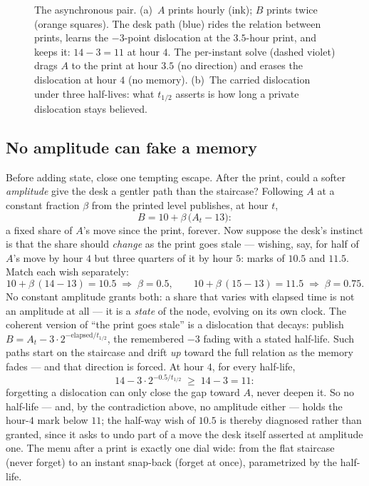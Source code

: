 \begin{figure}[htbp]
\centering
{}
\caption{The asynchronous pair.  (a)~$A$ prints hourly (ink); $B$
prints twice (orange squares).  The desk path (blue) rides the
relation between prints, learns the $-3$-point dislocation at the
$3.5$-hour print, and keeps it: $14-3=11$ at hour $4$.  The
per-instant solve (dashed violet) drags $A$ to the print at hour
$3.5$ (no direction) and erases the dislocation at hour $4$ (no
memory).  (b)~The carried dislocation under three half-lives: what
$t_{1/2}$ asserts is how long a private dislocation stays believed.}
\label{fig:grstory}
\end{figure}

\subsection{No amplitude can fake a memory}

Before adding state, close one tempting escape.  After the print,
could a softer \emph{amplitude} give the desk a gentler path than the
staircase?  Following $A$ at a constant fraction $\beta$ from the
printed level publishes, at hour $t$,
\[
B=10+\beta\,\bigl(A_t-13\bigr):
\]
a fixed share of $A$'s move since the print, forever.  Now suppose
the desk's instinct is that the share should \emph{change} as the
print goes stale --- wishing, say, for half of $A$'s move by hour $4$
but three quarters of it by hour $5$: marks of $10.5$ and $11.5$.
Match each wish separately:
\[
10+\beta\,(14-13)=10.5
\;\Longrightarrow\;
\beta=0.5,
\qquad
10+\beta\,(15-13)=11.5
\;\Longrightarrow\;
\beta=0.75 .
\]
No constant amplitude grants both: a share that varies with elapsed
time is not an amplitude at all --- it is a \emph{state} of the node,
evolving on its own clock.  The coherent version of ``the print goes
stale'' is a dislocation that decays: publish
$B=A_t-3\cdot2^{-\text{elapsed}/t_{1/2}}$, the remembered $-3$
fading with a stated half-life.  Such paths start on the staircase
and drift \emph{up} toward the full relation as the memory fades ---
and that direction is forced.  At hour $4$, for every half-life,
\[
14-3\cdot2^{-0.5/t_{1/2}}\;\ge\;14-3=11 :
\]
forgetting a dislocation can only close the gap toward $A$, never
deepen it.  So no half-life --- and, by the contradiction above, no
amplitude either --- holds the hour-$4$ mark below $11$; the
half-way wish of $10.5$ is thereby diagnosed rather than granted,
since it asks to undo part of a move the desk itself asserted at
amplitude one.  The menu after a print is exactly one dial wide:
from the flat staircase (never forget) to an instant snap-back
(forget at once), parametrized by the half-life.

